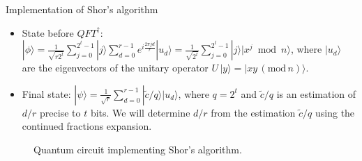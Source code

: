\begin{frame}{Implementation of Shor's algorithm}
		
			\begin{itemize}
				\item State before $QFT^{\dagger}$: $|\phi \rangle
				= \frac{1}{\sqrt{r2^t}} \sum_{j=0}^{2^t - 1} |j\rangle 
				\sum_{d=0}^{r-1} e^{i\frac{2\pi j d}{r}} |u_d\rangle
				= \frac{1}{\sqrt{2^t}} \sum_{j=0}^{2^t - 1} |j\rangle |x^j \bmod n\rangle$, where $|u_d\rangle$ are the eigenvectors of the unitary operator $U \, |y\rangle= |x y \,(\text{mod} \, n) \rangle$.
				
				\vspace{6pt}
				
				\item Final state: $|\psi \rangle
				= \frac{1}{\sqrt{r}}  \sum_{d=0}^{r-1} |\tilde{c}/q \rangle |u_d\rangle$, where $q=2^t$ and $\tilde{c}/q$ is an estimation of $d/r$ precise to $t$ bits. We will determine $d/r$ from the estimation $\tilde{c}/q$ using the continued fractions expansion.
			\end{itemize}
			\begin{figure}[H]
				\centering
{}
				\caption{Quantum circuit implementing Shor's algorithm.}
				\label{fig:shor_qc}
				
				
			\end{figure}
		
		
	\end{frame}